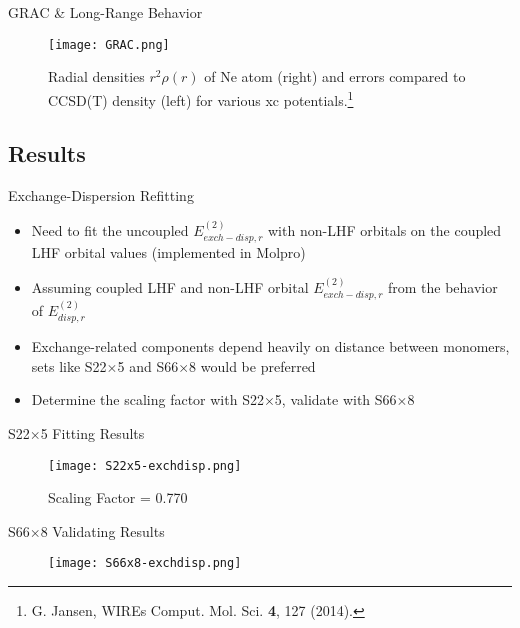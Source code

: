 \documentclass{beamer}
\begin{document}
        \begin{frame}{GRAC \& Long-Range Behavior}
            \begin{figure}
            \centering
            \texttt{[image: GRAC.png]}
            \caption{Radial densities $r^2\rho(r)$ of Ne atom (right) and errors compared to CCSD(T) density (left) for various xc potentials.\footnote{G. Jansen, WIREs Comput. Mol. Sci. \textbf{4}, 127 (2014).}} 
            \end{figure}
        \end{frame}

    \subsection{Results}
    
        \begin{frame}{Exchange-Dispersion Refitting}
            \begin{itemize}
                \item Need to fit the uncoupled $E_{exch-disp,r}^{(2)}$ with non-LHF orbitals on the coupled LHF orbital values (implemented in Molpro)
                \item Assuming coupled LHF and non-LHF orbital $E_{exch-disp,r}^{(2)}$ from the behavior of $E_{disp,r}^{(2)}$
                \item Exchange-related components depend heavily on distance between monomers, sets like S22$\times$5 and S66$\times$8 would be preferred
                \item Determine the scaling factor with S22$\times$5, validate with S66$\times$8 
            \end{itemize}
        \end{frame}

        \begin{frame}{S22$\times$5 Fitting Results}
            \begin{figure}
                \centering
                \texttt{[image: S22x5-exchdisp.png]}
                \caption{Scaling Factor = 0.770}
            \end{figure}   
        \end{frame}

        \begin{frame}{S66$\times8$ Validating Results}
            \begin{figure}
                \centering
                \texttt{[image: S66x8-exchdisp.png]}
            \end{figure}  
        \end{frame}
\end{document}
